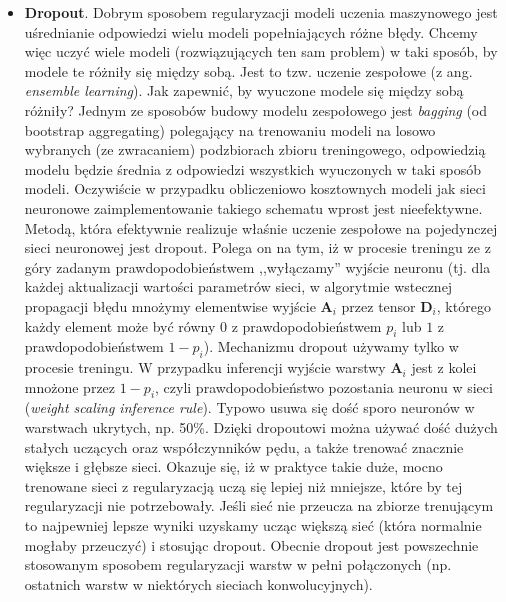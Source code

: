\documentclass{myclass}
\numberwithin{equation}{subsection}
\begin{document}
\begin{itemize}
\item \textbf{Dropout}. Dobrym sposobem regularyzacji modeli uczenia maszynowego jest uśrednianie
odpowiedzi wielu modeli popełniających różne błędy. Chcemy więc uczyć wiele modeli (rozwiązujących
ten sam problem) w taki sposób, by modele te różniły się między sobą. Jest to tzw. uczenie zespołowe
(z ang. \textit{ensemble learning}). Jak zapewnić, by wyuczone modele się między sobą różniły?
Jednym ze sposobów budowy modelu zespołowego jest \emph{bagging} (od bootstrap aggregating)
polegający na trenowaniu modeli na losowo wybranych (ze zwracaniem) podzbiorach zbioru treningowego,
odpowiedzią modelu będzie średnia z odpowiedzi wszystkich wyuczonych w taki sposób modeli.
Oczywiście w przypadku obliczeniowo kosztownych modeli jak sieci neuronowe zaimplementowanie takiego
schematu wprost jest nieefektywne. Metodą, która efektywnie realizuje właśnie uczenie zespołowe na
pojedynczej sieci neuronowej jest dropout. Polega on na tym, iż w procesie treningu ze z góry
zadanym prawdopodobieństwem ,,wyłączamy'' wyjście neuronu (tj. dla każdej aktualizacji wartości
parametrów sieci, w algorytmie wstecznej propagacji błędu mnożymy elementwise wyjście \(\bm{A}_i\)
przez tensor \(\bm{D}_i\), którego każdy element może być równy \(0\) z prawdopodobieństwem \(p_i\)
lub \(1\) z prawdopodobieństwem \(1-p_i\)). Mechanizmu dropout używamy tylko w procesie treningu. W
przypadku inferencji wyjście warstwy \(\bm{A}_i\) jest z kolei mnożone przez \(1 - p_i\), czyli
prawdopodobieństwo pozostania neuronu w sieci (\emph{weight scaling inference rule}). Typowo usuwa
się dość sporo neuronów w warstwach ukrytych, np. 50\%. Dzięki dropoutowi można używać dość dużych
stałych uczących oraz współczynników pędu, a także trenować znacznie większe i głębsze sieci.
Okazuje się, iż w praktyce takie duże, mocno trenowane sieci z regularyzacją uczą się lepiej niż
mniejsze, które by tej regularyzacji nie potrzebowały. Jeśli sieć nie przeucza na zbiorze trenującym
to najpewniej lepsze wyniki uzyskamy ucząc większą sieć (która normalnie mogłaby przeuczyć) i
stosując dropout. Obecnie dropout jest powszechnie stosowanym sposobem regularyzacji warstw w pełni
połączonych (np. ostatnich warstw w niektórych sieciach konwolucyjnych).


\end{itemize}
\end{document}
